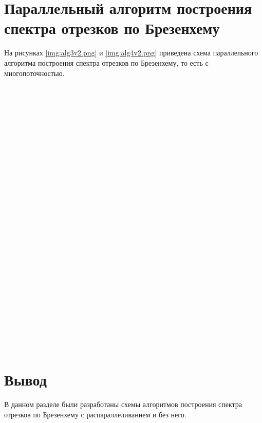 \section{Параллельный алгоритм построения спектра отрезков по Брезенхему}
На рисунках \ref{img:alg3v2.png} и \ref{img:alg4v2.png} приведена схема параллельного алгоритма построения спектра отрезков по Брезенхему, то есть с многопоточностью.
\\
\\
\\
\\
\\
\\
\\
\\
\\
\\
\\
\\
\\
\\
\\
\\
\\
\\
\\
\\
\\
\\
\\
\\
\\
\\
\\
\\


\FloatBarrier

\section*{Вывод}

В данном разделе были разработаны схемы алгоритмов построения спектра отрезков по Брезенхему с распараллеливанием и без него.